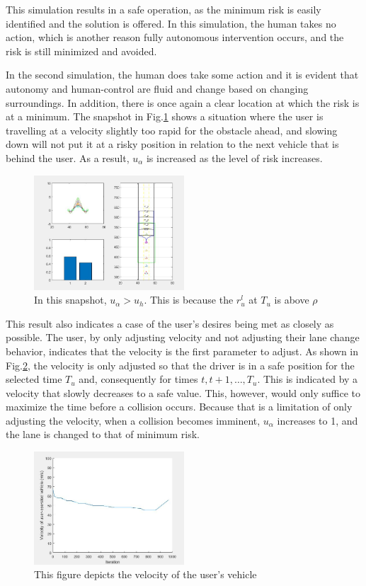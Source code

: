 \documentclass[conference]{IEEEtran}
\begin{document}
This simulation results in a safe operation, as the minimum risk is easily identified and the solution is offered. In this simulation, the human takes no action, which is another reason fully autonomous intervention occurs, and the risk is still minimized and avoided.


In the second simulation, the human does take some action and it is evident that autonomy and human-control are fluid and change based on changing surroundings. In addition, there is once again a clear location at which the risk is at a minimum. The snapshot in Fig.\ref{fig:cs2} shows a situation where the user is travelling at a velocity slightly too rapid for the obstacle ahead, and slowing down will not put it at a risky position in relation to the next vehicle that is behind the user. As a result, $u_{\alpha}$ is increased as the level of risk increases.

\begin{figure}[ht]
    \includegraphics[width=0.5\textwidth]{cs2.JPG}
    \caption{In this snapshot, $u_{\alpha} > u_{h}$. This is because the $r^l_u$ at $T_u$ is above $\rho$}
    \label{fig:cs2}
\end{figure}

This result also indicates a case of the user's desires being met as closely as possible. The user, by only adjusting velocity and not adjusting their lane change behavior, indicates that the velocity is the first parameter to adjust. As shown in Fig.\ref{fig:cs2c}, the velocity is only adjusted so that the driver is in a safe position for the selected time $T_u$ and, consequently for times $t,t+1,\ldots,T_u$. This is indicated by a velocity that slowly decreases to a safe value. This, however, would only suffice to maximize the time before a collision occurs. Because that is a limitation of only adjusting the velocity, when a collision becomes imminent, $u_\alpha$ increases to 1, and the lane is changed to that of minimum risk.

\begin{figure}[ht]
    \includegraphics[width=0.5\textwidth]{cs2c.JPG}
    \caption{This figure depicts the velocity of the user's vehicle}
    \label{fig:cs2c}
\end{figure}
\end{document}
